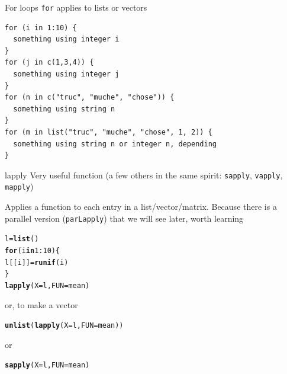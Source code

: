 \documentclass[aspectratio=169]{beamer}\usepackage[]{graphicx}\usepackage[]{xcolor}
\makeatletter
\newcommand{\hlnum}[1]{\textcolor[rgb]{0.686,0.059,0.569}{#1}}%
\newcommand{\hlopt}[1]{\textcolor[rgb]{0,0,0}{#1}}%
\newcommand{\hldef}[1]{\textcolor[rgb]{0.345,0.345,0.345}{#1}}%
\newcommand{\hlkwa}[1]{\textcolor[rgb]{0.161,0.373,0.58}{\textbf{#1}}}%
\newcommand{\hlkwb}[1]{\textcolor[rgb]{0.69,0.353,0.396}{#1}}%
\newcommand{\hlkwc}[1]{\textcolor[rgb]{0.333,0.667,0.333}{#1}}%
\newcommand{\hlkwd}[1]{\textcolor[rgb]{0.737,0.353,0.396}{\textbf{#1}}}%
\newenvironment{kframe}{%
 \def\at@end@of@kframe{}%
 \ifinner\ifhmode%
  \def\at@end@of@kframe{\end{minipage}}%
  \begin{minipage}{\columnwidth}%
 \fi\fi%
 \def\FrameCommand##1{\hskip\@totalleftmargin \hskip-\fboxsep
 \colorbox{shadecolor}{##1}\hskip-\fboxsep
     \hskip-\linewidth \hskip-\@totalleftmargin \hskip\columnwidth}%
 \MakeFramed {\advance\hsize-\width
   \@totalleftmargin\z@ \linewidth\hsize
   \@setminipage}}%
 {\par\unskip\endMakeFramed%
 \at@end@of@kframe}
\newenvironment{knitrout}{}{} %
\makeatother
\begin{document}
\begin{frame}[fragile]{For loops}
\texttt{for} applies to lists or vectors

\begin{knitrout}
\color{fgcolor}\begin{kframe}
\begin{verbatim}
for (i in 1:10) {
  something using integer i
}
for (j in c(1,3,4)) {
  something using integer j
}
for (n in c("truc", "muche", "chose")) {
  something using string n
}
for (m in list("truc", "muche", "chose", 1, 2)) {
  something using string n or integer n, depending
}
\end{verbatim}
\end{kframe}
\end{knitrout}
\end{frame}

\begin{frame}[fragile]{lapply}
Very useful function (a few others in the same spirit: \texttt{sapply}, \texttt{vapply}, \texttt{mapply})

Applies a function to each entry in a list/vector/matrix. Because there is a parallel version (\texttt{parLapply}) that we will see later, worth learning

\begin{knitrout}
\color{fgcolor}\begin{kframe}
\begin{alltt}
\hldef{l} \hlkwb{=} \hlkwd{list}\hldef{()}
\hlkwa{for} \hldef{(i} \hlkwa{in} \hlnum{1}\hlopt{:}\hlnum{10}\hldef{) \{}
        \hldef{l[[i]]} \hlkwb{=} \hlkwd{runif}\hldef{(i)}
\hldef{\}}
\hlkwd{lapply}\hldef{(}\hlkwc{X} \hldef{= l,} \hlkwc{FUN} \hldef{= mean)}
\end{alltt}
\end{kframe}
\end{knitrout}

or, to make a vector

\begin{knitrout}
\color{fgcolor}\begin{kframe}
\begin{alltt}
\hlkwd{unlist}\hldef{(}\hlkwd{lapply}\hldef{(}\hlkwc{X} \hldef{= l,} \hlkwc{FUN} \hldef{= mean))}
\end{alltt}
\end{kframe}
\end{knitrout}

or

\begin{knitrout}
\color{fgcolor}\begin{kframe}
\begin{alltt}
\hlkwd{sapply}\hldef{(}\hlkwc{X} \hldef{= l,} \hlkwc{FUN} \hldef{= mean)}
\end{alltt}
\end{kframe}
\end{knitrout}
\end{frame}
\end{document}

